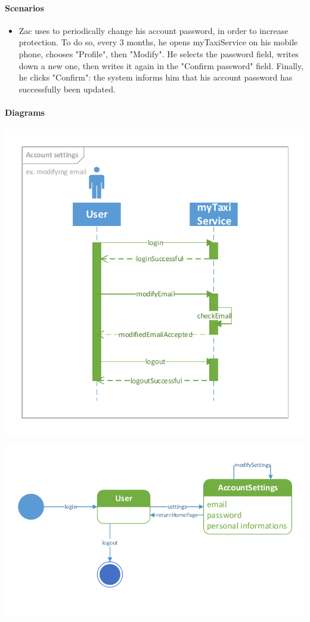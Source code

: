 	\paragraph{Scenarios}
		\begin{itemize}
			\item Zac uses to periodically change his account password, in order to increase protection. To do so, every 3 months, he opens myTaxiService on his mobile phone, chooses "Profile", then "Modify". He selects the password field, writes down a new one, then writes it again in the "Confirm password" field. Finally, he clicks "Confirm": the system informs him that his account password has successfully been updated.
		\end{itemize}
	
	\paragraph{Diagrams}
		\begin{center}
			\includegraphics[width=\textwidth]{diagrams/account_settings}
		\end{center}
			\begin{center}
				\includegraphics[width=\textwidth]{diagrams/settings}
			\end{center}
	
